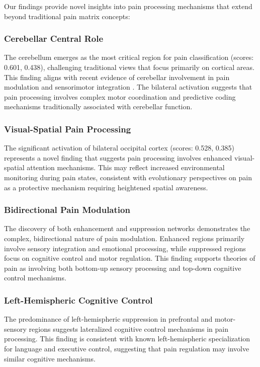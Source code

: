 \documentclass[10pt,journal,compsoc]{IEEEtran}
\begin{document}
Our findings provide novel insights into pain processing mechanisms that extend beyond traditional pain matrix concepts:

\subsubsection{Cerebellar Central Role}

The cerebellum emerges as the most critical region for pain classification (scores: 0.601, 0.438), challenging traditional views that focus primarily on cortical areas. This finding aligns with recent evidence of cerebellar involvement in pain modulation and sensorimotor integration \cite{moulton2010cerebellum,diedrichsen2019cerebellum}. The bilateral activation suggests that pain processing involves complex motor coordination and predictive coding mechanisms traditionally associated with cerebellar function.

\subsubsection{Visual-Spatial Pain Processing}

The significant activation of bilateral occipital cortex (scores: 0.528, 0.385) represents a novel finding that suggests pain processing involves enhanced visual-spatial attention mechanisms. This may reflect increased environmental monitoring during pain states, consistent with evolutionary perspectives on pain as a protective mechanism requiring heightened spatial awareness.

\subsubsection{Bidirectional Pain Modulation}

The discovery of both enhancement and suppression networks demonstrates the complex, bidirectional nature of pain modulation. Enhanced regions primarily involve sensory integration and emotional processing, while suppressed regions focus on cognitive control and motor regulation. This finding supports theories of pain as involving both bottom-up sensory processing and top-down cognitive control mechanisms.

\subsubsection{Left-Hemispheric Cognitive Control}

The predominance of left-hemispheric suppression in prefrontal and motor-sensory regions suggests lateralized cognitive control mechanisms in pain processing. This finding is consistent with known left-hemispheric specialization for language and executive control, suggesting that pain regulation may involve similar cognitive mechanisms.
\end{document}
